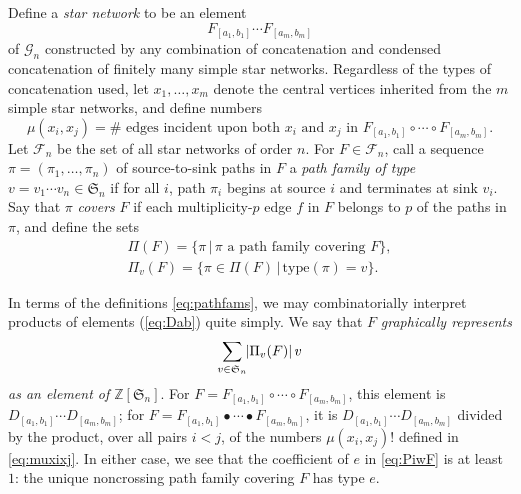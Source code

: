 \documentclass[12pt]{amsart}
\theoremstyle{definition}
\numberwithin{equation}{section}
\newcommand{\sn}{\mathfrak{S}_n}
\newcommand{\zsn}{\mathbb{Z}[\sn]}
\newcommand{\dfct}{\mathrm{dfct}}
\newcommand{\type}{\mathrm{type}}
\newcommand{\ntksp}{\negthickspace}
\newcommand{\net}[1]{\mathcal G_{#1}}
\newcommand{\cnet}[1]{\mathcal F^\bullet_{#1}}
\newcommand{\ocnet}[1]{\mathcal F_{#1}}%
\begin{document}
Define a {\em star network} to be an element 
\begin{equation*}
    F_{[a_1,b_1]} \cdots F_{[a_m,b_m]}
\end{equation*}
of $\net n$ constructed by any combination of concatenation and condensed concatenation of finitely many simple star networks.  Regardless of the types of concatenation used, let $x_1,\dotsc,x_m$
denote the central vertices inherited from the $m$ simple star networks, and define
numbers
\begin{equation}\label{eq:muxixj}
\mu(x_i,x_j) = \# \text{ edges incident upon both $x_i$ and $x_j$ in } F_{[a_1,b_1]} \circ \cdots \circ F_{[a_m,b_m]}.
\end{equation}
Let $\ocnet n$ be the set of all star networks of order $n$. 
For $F \in \ocnet n$, call a sequence $\pi = (\pi_1,\dotsc,\pi_n)$
of source-to-sink paths in 
$F$ a {\em path family of type $v = v_1 \cdots v_n \in \sn$}
 if for all $i$, path $\pi_i$ begins at source $i$ and terminates at sink $v_i$.  Say that $\pi$ {\em covers} $F$ if each multiplicity-$p$ edge $f$ in $F$ 
 belongs to
 $p$ of the paths in $\pi$, 
 and define the sets
\begin{equation}\label{eq:pathfams}
  \begin{gathered}
    \Pi(F) = \{ \pi \,|\, \pi \text{ a path family covering } F \},\\
    \Pi_v(F) = \{ \pi \in \Pi(F) \,|\, \type(\pi) = v \}.
    \end{gathered}
\end{equation}

In terms of the definitions \eqref{eq:pathfams}, we may combinatorially interpret products of %
elements (\ref{eq:Dab}) quite simply.  
We say that $F$ {\em graphically represents}
\begin{equation}\label{eq:PiwF}
    \sum_{v \in \sn} %
    \ntksp |\Pi_v(F)|\,v
\end{equation}
{\em as an element of $\zsn$}.
For
$F = F_{[a_1,b_1]} \circ \cdots \circ F_{[a_m,b_m]}$,
this element is
$D_{[a_1,b_1]} \cdots D_{[a_m,b_m]}$;
for
$F = F_{[a_1,b_1]} \bullet \cdots \bullet F_{[a_m,b_m]}$,
it is
$D_{[a_1,b_1]} \cdots D_{[a_m,b_m]}$
divided by the product, over all pairs $i < j$,
of the numbers $\mu(x_i,x_j)!$ defined in \eqref{eq:muxixj}.
In either case, we
see that the coefficient of $e$ in \eqref{eq:PiwF} is at least $1$: the unique noncrossing path family covering $F$ has type $e$.
\end{document}
